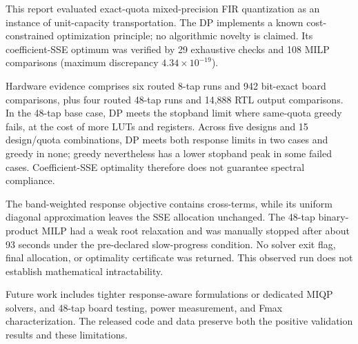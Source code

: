 This report evaluated exact-quota mixed-precision FIR quantization as
an instance of unit-capacity transportation. The DP implements a known
cost-constrained optimization principle; no algorithmic novelty is
claimed. Its coefficient-SSE optimum was verified by 29 exhaustive
checks and 108 MILP comparisons (maximum discrepancy
$4.34\times10^{-19}$).

Hardware evidence comprises six routed 8-tap runs and 942 bit-exact
board comparisons, plus four routed 48-tap runs and 14,888 RTL output
comparisons. In the 48-tap base case, DP meets the stopband limit where
same-quota greedy fails, at the cost of more LUTs and registers.
Across five designs and 15 design/quota combinations, DP meets both
response limits in two cases and greedy in none; greedy nevertheless
has a lower stopband peak in some failed cases. Coefficient-SSE
optimality therefore does not guarantee spectral compliance.

The band-weighted response objective contains cross-terms, while its
uniform diagonal approximation leaves the SSE allocation unchanged.
The 48-tap binary-product MILP had a weak root relaxation and was
manually stopped after about 93 seconds under the pre-declared
slow-progress condition. No solver exit flag, final allocation, or
optimality certificate was returned. This observed run does not
establish mathematical intractability.

Future work includes tighter response-aware formulations or dedicated
MIQP solvers, and 48-tap board testing, power measurement, and Fmax
characterization. The released code and data preserve both the positive
validation results and these limitations.

